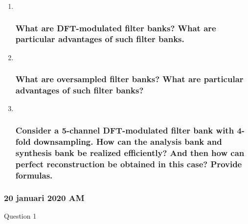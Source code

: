 \documentclass[
  a4paper,
  ,captions=tableheading
]{scrartcl}
\begin{document}
\begin{enumerate}
\def\labelenumi{\arabic{enumi}.}
\item ~
  \subsubsection{What are DFT-modulated filter banks? What are
  particular advantages of such filter
  banks.}\label{what-are-dft-modulated-filter-banks-what-are-particular-advantages-of-such-filter-banks.}
\item ~
  \subsubsection{What are oversampled filter banks? What are particular
  advantages of such filter
  banks?}\label{what-are-oversampled-filter-banks-what-are-particular-advantages-of-such-filter-banks}
\item ~
  \subsubsection{Consider a 5-channel DFT-modulated filter bank with
  4-fold downsampling. How can the analysis bank and synthesis bank be
  realized efficiently? And then how can perfect reconstruction be
  obtained in this case? Provide
  formulas.}\label{consider-a-5-channel-dft-modulated-filter-bank-with-4-fold-downsampling.-how-can-the-analysis-bank-and-synthesis-bank-be-realized-efficiently-and-then-how-can-perfect-reconstruction-be-obtained-in-this-case-provide-formulas.}
\end{enumerate}

\subsubsection{\texorpdfstring{\textbf{20 januari 2020
AM}}{20 januari 2020 AM}}\label{januari-2020-am-1}

Question 1
\end{document}
